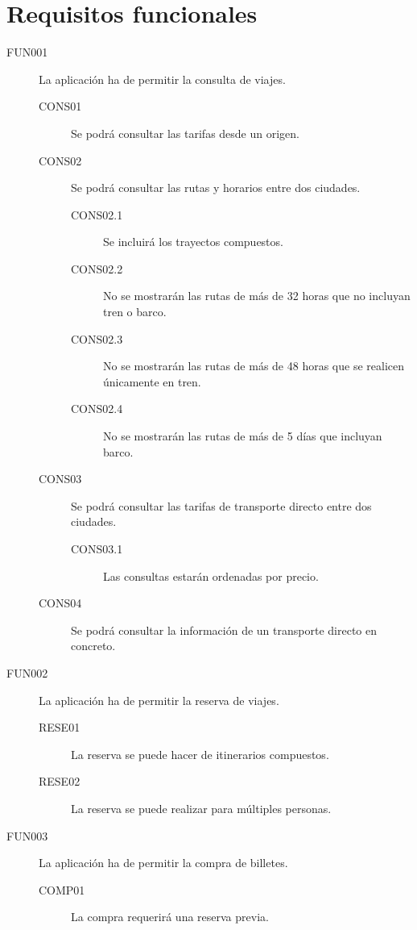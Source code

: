   \section{Requisitos funcionales}
    \begin{description}
      \item[FUN001] La aplicación ha de permitir la consulta de viajes.
      \begin{description}
	\item[CONS01] Se podrá consultar las tarifas desde un origen.
	\item[CONS02] Se podrá consultar las rutas y horarios entre dos ciudades.
	\begin{description}
	  \item[CONS02.1] Se incluirá los trayectos compuestos. 
	  \item[CONS02.2] No se mostrarán las rutas de más de 32 horas que no incluyan tren o barco.
	  \item[CONS02.3] No se mostrarán las rutas de más de 48 horas que se realicen únicamente en tren.
	  \item[CONS02.4] No se mostrarán las rutas de más de 5 días que incluyan barco.
	\end{description}
	\item[CONS03] Se podrá consultar las tarifas de transporte directo entre dos ciudades.
	\begin{description}
	  \item[CONS03.1] Las consultas estarán ordenadas por precio.
	\end{description}
	\item[CONS04] Se podrá consultar la información de un transporte directo en concreto.
      \end{description}

      \item[FUN002] La aplicación ha de permitir la reserva de viajes.
      \begin{description}
	\item [RESE01] La reserva se puede hacer de itinerarios compuestos.
	\item [RESE02] La reserva se puede realizar para múltiples personas.
      \end{description}

      \item[FUN003] La aplicación ha de permitir la compra de billetes.
      \begin{description}
	\item[COMP01] La compra requerirá una reserva previa.
      \end{description}


\end{description}
